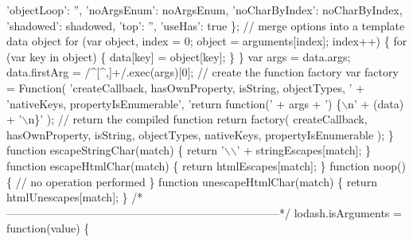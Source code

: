 \begin{DoxyCodeInclude}
{{\textcolor{stringliteral}{      'objectLoop': '',}
\textcolor{stringliteral}{      'noArgsEnum': noArgsEnum,}
\textcolor{stringliteral}{      'noCharByIndex': noCharByIndex,}
\textcolor{stringliteral}{      'shadowed': shadowed,}
\textcolor{stringliteral}{      'top': '',}
\textcolor{stringliteral}{      'useHas': true}
\textcolor{stringliteral}{    \};}
\textcolor{stringliteral}{}
\textcolor{stringliteral}{    // merge options into a template data object}
\textcolor{stringliteral}{    for (var object, index = 0; object = arguments[index]; index++) \{}
\textcolor{stringliteral}{      for (var key in object) \{}
\textcolor{stringliteral}{        data[key] = object[key];}
\textcolor{stringliteral}{      \}}
\textcolor{stringliteral}{    \}}
\textcolor{stringliteral}{    var args = data.args;}
\textcolor{stringliteral}{    data.firstArg = /^[^,]+/.exec(args)[0];}
\textcolor{stringliteral}{}
\textcolor{stringliteral}{    // create the function factory}
\textcolor{stringliteral}{    var factory = Function(}
\textcolor{stringliteral}{        'createCallback, hasOwnProperty, isString, objectTypes, ' +}
\textcolor{stringliteral}{        'nativeKeys, propertyIsEnumerable',}
\textcolor{stringliteral}{      'return function(' + args + ') \{\(\backslash\)n' + (data) + '\(\backslash\)n\}'}
\textcolor{stringliteral}{    );}
\textcolor{stringliteral}{    // return the compiled function}
\textcolor{stringliteral}{    return factory(}
\textcolor{stringliteral}{      createCallback, hasOwnProperty, isString, objectTypes,}
\textcolor{stringliteral}{      nativeKeys, propertyIsEnumerable}
\textcolor{stringliteral}{    );}
\textcolor{stringliteral}{  \}}
\textcolor{stringliteral}{}
\textcolor{stringliteral}{  function escapeStringChar(match) \{}
\textcolor{stringliteral}{    return '\(\backslash\)\(\backslash\)' + stringEscapes[match];}
\textcolor{stringliteral}{  \}}
\textcolor{stringliteral}{}
\textcolor{stringliteral}{  function escapeHtmlChar(match) \{}
\textcolor{stringliteral}{    return htmlEscapes[match];}
\textcolor{stringliteral}{  \}}
\textcolor{stringliteral}{}
\textcolor{stringliteral}{  function noop() \{}
\textcolor{stringliteral}{    // no operation performed}
\textcolor{stringliteral}{  \}}
\textcolor{stringliteral}{}
\textcolor{stringliteral}{  function unescapeHtmlChar(match) \{}
\textcolor{stringliteral}{    return htmlUnescapes[match];}
\textcolor{stringliteral}{  \}}
\textcolor{stringliteral}{}
\textcolor{stringliteral}{  /*--------------------------------------------------------------------------*/}
\textcolor{stringliteral}{  lodash.isArguments = function(value) \{}
}}
\end{DoxyCodeInclude}
